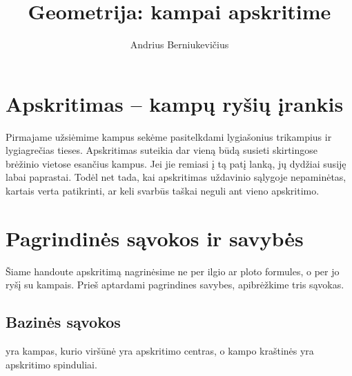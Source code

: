 \documentclass[11pt,a4paper]{scrartcl}
\title{Geometrija: kampai apskritime}
\author{Andrius Berniukevičius}
\begin{document}
\maketitle

\section{Apskritimas – kampų ryšių įrankis}

Pirmajame užsiėmime kampus sekėme pasitelkdami lygiašonius trikampius ir lygiagrečias tieses. Apskritimas suteikia dar vieną būdą susieti skirtingose brėžinio vietose esančius kampus. Jei jie remiasi į tą patį lanką, jų dydžiai susiję labai paprastai. Todėl net tada, kai apskritimas uždavinio sąlygoje nepaminėtas, kartais verta patikrinti, ar keli svarbūs taškai neguli ant vieno apskritimo.

\section{Pagrindinės sąvokos ir savybės}

Šiame handoute apskritimą nagrinėsime ne per ilgio ar ploto formules, o per jo ryšį su kampais. Prieš aptardami pagrindines savybes, apibrėžkime tris sąvokas.

\subsection{Bazinės sąvokos}

\begin{definition}
 yra kampas, kurio viršūnė yra apskritimo centras, o kampo kraštinės yra apskritimo spinduliai.
\end{definition}

\begin{center}
\end{center}
\end{document}
